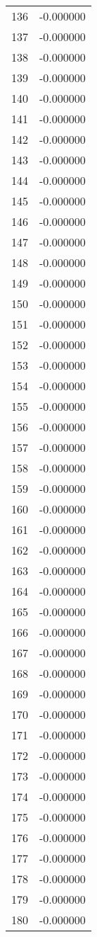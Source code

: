 \documentclass[12pt]{article}
\begin{document}
\begin{longtable}{@{}cc@{}}
136 & -0.000000 \\
137 & -0.000000 \\
138 & -0.000000 \\
139 & -0.000000 \\
140 & -0.000000 \\
141 & -0.000000 \\
142 & -0.000000 \\
143 & -0.000000 \\
144 & -0.000000 \\
145 & -0.000000 \\
146 & -0.000000 \\
147 & -0.000000 \\
148 & -0.000000 \\
149 & -0.000000 \\
150 & -0.000000 \\
151 & -0.000000 \\
152 & -0.000000 \\
153 & -0.000000 \\
154 & -0.000000 \\
155 & -0.000000 \\
156 & -0.000000 \\
157 & -0.000000 \\
158 & -0.000000 \\
159 & -0.000000 \\
160 & -0.000000 \\
161 & -0.000000 \\
162 & -0.000000 \\
163 & -0.000000 \\
164 & -0.000000 \\
165 & -0.000000 \\
166 & -0.000000 \\
167 & -0.000000 \\
168 & -0.000000 \\
169 & -0.000000 \\
170 & -0.000000 \\
171 & -0.000000 \\
172 & -0.000000 \\
173 & -0.000000 \\
174 & -0.000000 \\
175 & -0.000000 \\
176 & -0.000000 \\
177 & -0.000000 \\
178 & -0.000000 \\
179 & -0.000000 \\
180 & -0.000000 \\

\end{longtable}
\end{document}
